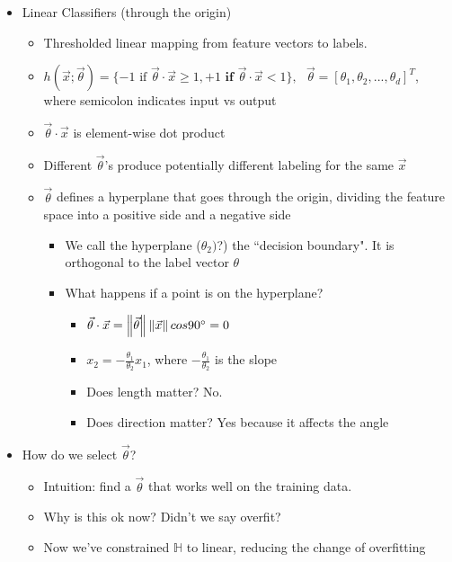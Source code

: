 \documentclass[10pt, oneside]{article}
\newcommand{\norm}[1]{\left\lVert#1\right\rVert}
\begin{document}
\begin{itemize}
\begin{itemize}
    \end{itemize}
    \item Linear Classifiers (through the origin)
    \begin{itemize}
        \item Thresholded linear mapping from feature vectors to labels.
        \item $h(\vec{x}; \vec{\theta}) = \{-1 \text{ if } \vec{\theta} \cdot \vec{x} \geq 1, +1 \textbf{ if } \vec{\theta}\cdot \vec{x} < 1\},\text{   } \vec{\theta} = [\theta_1,\theta_2, ..., \theta_d]^T$, where semicolon indicates input vs output
        \item $\vec{\theta} \cdot \vec{x}$ is element-wise dot product
        \item Different $\vec{\theta}$'s produce potentially different labeling for the same $\vec{x}$
        \item $\vec{\theta}$ defines a hyperplane that goes through the origin, dividing the feature space into a positive side and a negative side
        \begin{itemize}
            \item We call the hyperplane ($\theta_2)$?) the ``decision boundary". It is orthogonal to the label vector $\theta$
            \item What happens if a point is on the hyperplane?
            \begin{itemize}
                \item $\vec{\theta} \cdot \vec{x} = \norm{\vec{\theta}}\norm{\vec{x}}cos90\degree = 0$
                \item $x_2 = - \frac{\theta_1}{\theta_2}x_1$, where $-\frac{\theta_1}{\theta_2}$ is the slope
                \item Does length matter? No.
                \item Does direction matter? Yes because it affects the angle
            \end{itemize}
        \end{itemize}
    \end{itemize}
    \item How do we select $\vec{\theta}$?
    \begin{itemize}
        \item Intuition: find a $\vec{\theta}$ that works well on the training data.
        \item Why is this ok now? Didn't we say overfit?
        \item Now we've constrained $\mathbb{H}$ to linear, reducing the change of overfitting

\end{itemize}
\end{itemize}
\end{document}

